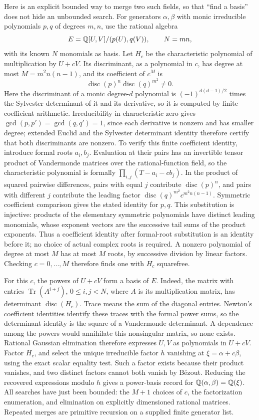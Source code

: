 Here is an explicit bounded way to merge two such fields, so that
``find a basis'' does not hide an unbounded search.  For generators
$\alpha,\beta$ with monic irreducible polynomials $p,q$ of degrees $m,n$,
use the rational algebra
\[
 E=\mathbb Q[U,V]/(p(U),q(V)),\qquad N=mn,
\]
with its known $N$ monomials as basis.  Let $H_c$ be the characteristic
polynomial of multiplication by $U+cV$.  Its discriminant, as a
polynomial in $c$, has degree at most $M=m^2n(n-1)$, and its coefficient
of $c^M$ is
\[
\operatorname{disc}(p)^n\operatorname{disc}(q)^{m^2}\ne0.
\]
Here the discriminant of a monic degree-$d$ polynomial is
$(-1)^{d(d-1)/2}$ times the Sylvester determinant of it and its derivative,
so it is computed by finite coefficient arithmetic.
Irreducibility in characteristic zero gives
$\gcd(p,p')=\gcd(q,q')=1$, since each derivative is nonzero and has
smaller degree; extended Euclid and the Sylvester determinant identity
therefore certify that both discriminants are nonzero.
To verify this finite coefficient identity, introduce formal roots
$a_i,b_j$.  Evaluation at their pairs has an invertible tensor product
of Vandermonde matrices over the rational-function field, so the
characteristic polynomial is formally $\prod_{i,j}(T-a_i-cb_j)$.
In the product
of squared pairwise differences, pairs with equal $j$ contribute
$\operatorname{disc}(p)^n$, and pairs with different $j$ contribute the
leading factor $\operatorname{disc}(q)^{m^2}c^{m^2n(n-1)}$.
Symmetric coefficient comparison gives the stated identity for $p,q$.
This substitution is injective: products of the elementary symmetric
polynomials have distinct leading monomials, whose exponent vectors are
the successive tail sums of the product exponents.  Thus a coefficient
identity after formal-root substitution is an identity before it;
no choice of actual complex roots is required.  A nonzero polynomial of
degree at most $M$ has at most $M$ roots, by successive division by linear
factors.  Checking $c=0,\ldots,M$ therefore finds one with $H_c$ squarefree.

For this $c$, the powers of $U+cV$ form a basis of $E$.  Indeed, the
matrix with entries
$\operatorname{Tr}(A^{i+j})$, $0\le i,j<N$, where $A$ is its
multiplication matrix, has determinant $\operatorname{disc}(H_c)$.
Trace means the sum of the diagonal entries.  Newton's coefficient
identities identify these traces with the formal power sums, so the
determinant identity is the square of a Vandermonde determinant.
A dependence among the powers
would annihilate this nonsingular matrix, so none exists.  Rational
Gaussian elimination therefore expresses $U,V$ as polynomials in $U+cV$.
Factor $H_c$, and select the unique irreducible factor $h$ vanishing at
$\xi=\alpha+c\beta$, using the exact scalar equality test.  Such a factor
exists because their product vanishes, and two distinct factors cannot
both vanish by B\'ezout.  Reducing the recovered expressions modulo $h$
gives a power-basis record for $\mathbb Q(\alpha,\beta)=\mathbb Q(\xi)$.
All searches have just been bounded: the $M+1$ choices of $c$, the
factorization enumeration, and elimination on explicitly dimensioned
rational matrices.  Repeated merges are primitive recursion on a supplied
finite generator list.

